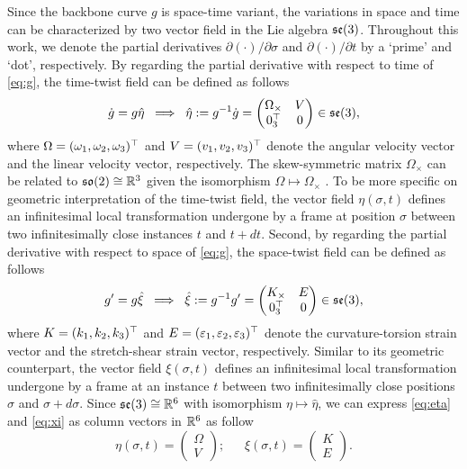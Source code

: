 Since the backbone curve $g$ is space-time variant, the variations in space and time can be characterized by two vector field in the Lie algebra $\se{3}$. Throughout this work, we denote the partial derivatives ${\partial (\cdot)}/{\partial \sigma}$ and ${\partial (\cdot)}/{\partial t}$  by a `prime' and `dot', respectively. By regarding the partial derivative with respect to time of \eqref{eq:g}, the time-twist field can be defined as follows
\begin{equation}
\dot{g} = g \hat{\eta}\; \implies \; \hat{\eta} := g^{-1} \dot{g} = \begin{pmatrix} {\Omega}_\times & V \\ 0_3^\tr & 0 \end{pmatrix} \in \se{3},
\label{eq:eta}
\end{equation}
where $\Omega = (\omega_1, \omega_2, \omega_3)^\tr$ and $V = (v_1, v_2, v_3)^\tr$ denote the angular velocity vector and the linear velocity vector, respectively. The skew-symmetric matrix $\Omega_\times$ can be related to $\sog{3} \cong \R^3$ given the isomorphism $\Omega \mapsto \Omega_\times$ \cite{Murray1994,Boyer2010,Traversaro2016}. To be more specific on geometric interpretation of the time-twist field, the vector field $\eta(\sigma,t)$ defines an infinitesimal local transformation undergone by a frame at position $\sigma$ between two infinitesimally close instances $t$ and $t + dt$. Second, by regarding the partial derivative with respect to space of \eqref{eq:g}, the space-twist field can be defined as follows
\begin{equation}
{g}' = g \hat{\xi} \; \implies \; \hat{\xi} :=  g^{-1} g' = \begin{pmatrix} {K}_\times & E \\ 0_3^\tr & 0 \end{pmatrix} \in \se{3},
\label{eq:xi}
\end{equation}
where $K = (k_1, k_2, k_3)^\tr$ and $E = (\varepsilon_1, \varepsilon_2, \varepsilon_3)^\tr$ denote the curvature-torsion strain vector and the stretch-shear strain vector, respectively. Similar to its geometric counterpart, the vector field $\xi(\sigma,t)$ defines an infinitesimal local transformation undergone by a frame at an instance $t$ between two infinitesimally close positions $\sigma$ and $\sigma + d\sigma$. Since $\se{3} \cong \R^6$ with isomorphism $\eta \mapsto \hat{\eta}$, we can express \eqref{eq:eta} and \eqref{eq:xi} as column vectors in $\R^6$ as follow
\begin{equation}
\eta(\sigma,t) = \begin{pmatrix} \Omega \\ V \end{pmatrix}; \; \quad \;  \xi(\sigma,t) = \begin{pmatrix} K \\ E \end{pmatrix}.
\end{equation}
